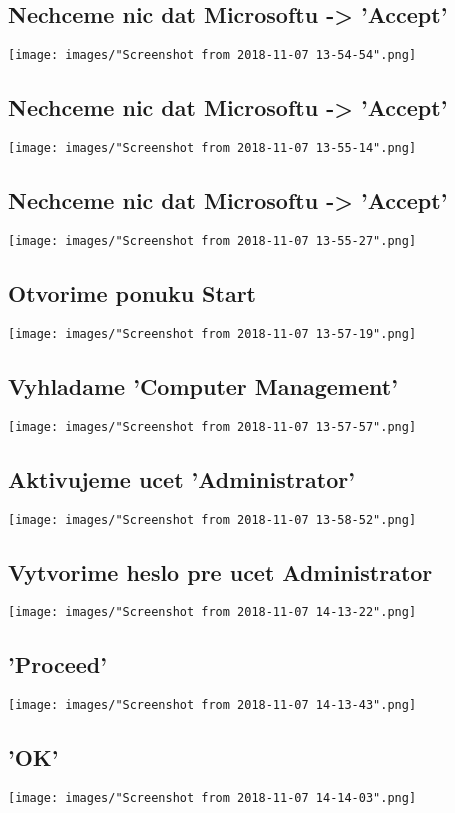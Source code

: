 \documentclass[slovak]{article}
\begin{document}
  \subsection{Nechceme nic dat Microsoftu -> 'Accept'}
  \texttt{[image: images/"Screenshot from 2018-11-07 13-54-54".png]}
  \subsection{Nechceme nic dat Microsoftu -> 'Accept'}
  \texttt{[image: images/"Screenshot from 2018-11-07 13-55-14".png]}
  \subsection{Nechceme nic dat Microsoftu -> 'Accept'}
  \texttt{[image: images/"Screenshot from 2018-11-07 13-55-27".png]}
  \subsection{Otvorime ponuku Start}
  \texttt{[image: images/"Screenshot from 2018-11-07 13-57-19".png]}
  \subsection{Vyhladame 'Computer Management'}
  \texttt{[image: images/"Screenshot from 2018-11-07 13-57-57".png]}
  \subsection{Aktivujeme ucet 'Administrator'}
  \texttt{[image: images/"Screenshot from 2018-11-07 13-58-52".png]}
  \subsection{Vytvorime heslo pre ucet Administrator}
  \texttt{[image: images/"Screenshot from 2018-11-07 14-13-22".png]}
  \subsection{'Proceed'}
  \texttt{[image: images/"Screenshot from 2018-11-07 14-13-43".png]}
  \subsection{'OK'}
  \texttt{[image: images/"Screenshot from 2018-11-07 14-14-03".png]}
\end{document}
